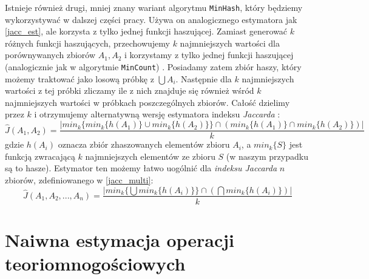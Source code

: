 Istnieje również drugi, mniej znany wariant algorytmu \texttt{MinHash}, który będziemy wykorzystywać w dalszej części pracy.
 Używa on analogicznego estymatora jak \ref{jacc_est}, ale korzysta z tylko jednej funkcji haszującej. Zamiast generować $k$ różnych funkcji haszujących, przechowujemy $k$ najmniejszych wartości dla porównywanych zbiorów $A_1, A_2$ i korzystamy z tylko jednej funkcji haszującej (analogicznie jak w algorytmie \texttt{MinCount}) \cite{adroll}. Posiadamy zatem zbiór haszy, który możemy traktować jako losową próbkę z $\bigcup A_i$. Następnie dla $k$ najmniejszych wartości z tej próbki zliczamy ile z nich znajduje się również wśród $k$ najmniejszych wartości w próbkach poszczególnych zbiorów. Całość dzielimy przez $k$ i otrzymujemy alternatywną wersję estymatora indeksu \textit{Jaccarda} \cite{adroll}:
 \begin{equation}
 \hat{J}(A_1, A_2) = \frac{|min_{k}\{min_{k} \{ h(A_1) \} \cup min_{k} \{ h(A_2) \} \} \cap (min_{k}\{h(A_1)\} \cap min_{k}\{h(A_2)\})|}{k}
 \end{equation}
 gdzie $h(A_i)$ oznacza zbiór zhaszowanych elementów zbioru $A_i$, a $min_{k}\{S\}$ jest funkcją zwracającą $k$ najmniejszych elementów ze zbioru $S$ (w naszym przypadku są to hasze).
 Estymator ten możemy łatwo uogólnić dla \textit{indeksu Jaccarda} $n$ zbiorów, zdefiniowanego w \ref{jacc_multi}:
\begin{equation}
    \hat{J}(A_1, A_2, ..., A_n) = \frac{|min_{k}\{\bigcup min_{k} \{ h(A_i) \} \} \cap (\bigcap min_{k}\{h(A_i)\})|}{k}
\end{equation}

\section{Naiwna estymacja operacji teoriomnogościowych}
\label{naive_est}


